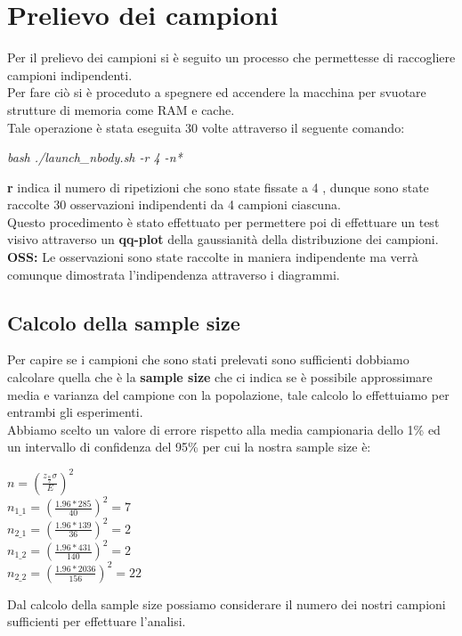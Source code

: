 \section{Prelievo dei campioni}
Per il prelievo dei campioni si è seguito un processo che permettesse di raccogliere campioni indipendenti.\\
Per fare ciò si è proceduto a spegnere ed accendere la macchina per svuotare strutture di memoria come RAM e cache.\\
Tale operazione è stata eseguita 30 volte attraverso il seguente comando:
\begin{center}
    \textit{bash ./launch\_nbody.sh -r 4 -n*}
\end{center}
\textbf{r} indica il numero di ripetizioni che sono state fissate a 4 , dunque sono state raccolte 30 osservazioni indipendenti da 4 campioni ciascuna.\\
Questo procedimento è stato effettuato per permettere poi di effettuare un test visivo attraverso un \textbf{qq-plot} della gaussianità della distribuzione dei campioni.\\
\textbf{OSS: }Le osservazioni sono state raccolte in maniera indipendente ma verrà comunque dimostrata l'indipendenza attraverso i diagrammi.\\
\subsection{Calcolo della sample size}
Per capire se i campioni che sono stati prelevati sono sufficienti dobbiamo calcolare quella che è la \textbf{sample size} che ci indica se è possibile approssimare media e varianza del campione con la popolazione, tale calcolo lo effettuiamo per entrambi gli esperimenti.\\
Abbiamo scelto un valore di errore rispetto alla media campionaria dello 1\% ed un intervallo di confidenza del 95\% per cui la nostra sample size è:\\
\begin{center}
    
        $n = (\frac{z_{\frac{\alpha}{2}} \sigma}{E})^2$ \\
        $n_{1\_1} = (\frac{1.96*285}{40})^2 = 7$ \\
        $n_{2\_1} = (\frac{1.96*139}{36})^2 = 2$ \\
        $n_{1\_2} = (\frac{1.96*431}{140})^2 = 2$ \\
        $n_{2\_2} = (\frac{1.96*2036}{156})^2 = 22$ \\
    
\end{center}
Dal calcolo della sample size possiamo considerare il numero dei nostri campioni sufficienti per effettuare l'analisi.\\
